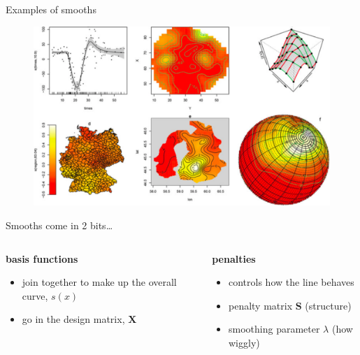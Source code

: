 \documentclass{beamer}
\begin{document}
\begin{frame}{Examples of smooths}
  \begin{figure}[h]
    \begin{center}
      \includegraphics[width=\textwidth]{figures/smooths.png}
    \end{center}
  \end{figure}
\end{frame}

\begin{frame}{Smooths come in 2 bits\ldots}
  \begin{columns}[T]
    \begin{column}{0.40\textwidth}
      \textbf{basis functions}
      \begin{itemize}
        \item join together to make up the overall curve, $s(x)$
        \item go in the design matrix, $\textbf{X}$
      \end{itemize}
    \end{column}
    \begin{column}{0.58\textwidth}
      \textbf{penalties}
      \begin{itemize}
        \item controls how the line behaves
        \item penalty matrix $\textbf{S}$ (structure)
        \item smoothing parameter $\lambda$ (how wiggly)
      \end{itemize}
    \end{column}
  \end{columns}
\end{frame}
\end{document}
